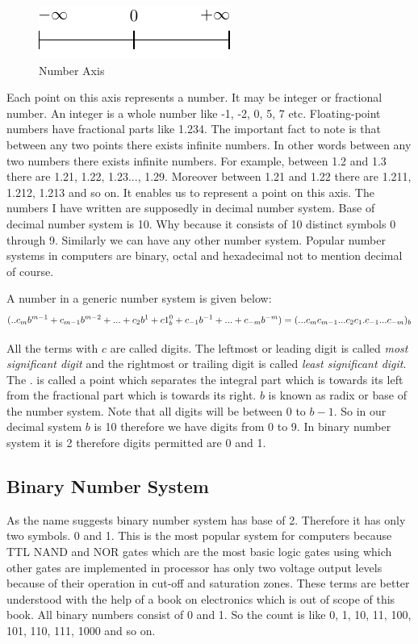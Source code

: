 \begin{figure}[H]
\begin{center}
\includegraphics{figs/ns.pdf}
\end{center}
\caption{Number Axis}
\end{figure}

Each point on this axis represents a number. It may be integer or fractional
number. An integer is a whole number like -1, -2, 0, 5, 7 etc. Floating-point
numbers have fractional parts like 1.234. The important fact to note is that
between any two points there exists infinite numbers. In other words between
any two numbers there exists infinite numbers. For example, between 1.2 and 1.3
there are 1.21, 1.22, 1.23..., 1.29. Moreover between 1.21 and 1.22 there are
1.211, 1.212, 1.213 and so on. It enables us to represent a point on this
axis. The numbers I have written are supposedly in decimal number system. Base
of decimal number system is 10. Why because it consists of 10 distinct symbols
0 through 9. Similarly we can have any other number system. Popular number
systems in computers are binary, octal and hexadecimal not to mention decimal
of course.

A number in a generic number system is given below:
\begin{equation}
(.. c_mb^{m-1} + c_{m-1}b^{m-2}+ ... + c_2b^1 + c1_b^0 + c_{-1}b^{-1} +
... + c_{-m}b^{-m} ) \\ = (... c_mc_{m-1}...c_2c_1.c_{-1}...c_{-m})_b
\end{equation}

All the terms with $c$  are called digits. The leftmost or leading digit is
called \textit{most significant digit} and the rightmost or trailing digit is
called \textit{least significant digit}. The . is called a point which
separates the integral part which is towards its left from the fractional part
which is towards its right. $b$  is known as radix or base of the number
system. Note that all digits will be between $0$ to $b-1$. So in our decimal
system $b$  is 10 therefore we have digits from 0 to 9. In binary number system
it is 2 therefore digits permitted are 0 and 1.

\subsection{Binary Number System}
As the name suggests binary number system has base of 2. Therefore it has only
two symbols. 0 and 1. This is the most popular system for computers because TTL
NAND and NOR gates which are the most basic logic gates using which other gates
are implemented in processor has only two voltage output levels because of
their operation in cut-off and saturation zones. These terms are better
understood with the help of a book on electronics which is out of scope of this
book. All binary numbers consist of 0 and 1. So the count is like 0, 1, 10, 11,
100, 101, 110, 111, 1000 and so on.

